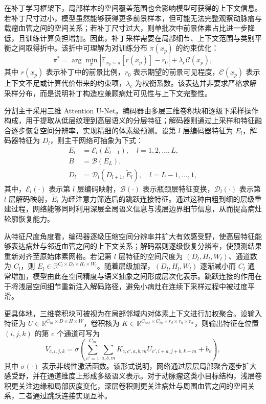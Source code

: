 在补丁学习框架下，局部样本的空间覆盖范围也会影响模型可获得的上下文信息。若补丁尺寸过小，模型虽然能够获得更多前景样本，但可能无法完整观察动脉瘤与载瘤血管之间的空间关系；若补丁尺寸过大，则单批次中前景体素占比进一步降低，且训练计算负担增加。因此，补丁采样需要在局部细节、上下文范围与类别平衡之间取得折中。该折中可理解为对训练分布 $\pi(x_p)$ 的约束优化：
\begin{equation}
\pi^{\ast}=\arg\min_{\pi}\left|\mathbb{E}_{x_p\sim\pi}[r(x_p)]-r_0\right|+\lambda_c\mathcal{C}(x_p),
\end{equation}
其中 $r(x_p)$ 表示补丁中的前景比例，$r_0$ 表示期望的前景可见程度，$\mathcal{C}(x_p)$ 表示上下文不足或计算代价带来的约束项，$\lambda_c$ 为权衡系数。该表达并非要求严格求解采样分布，而是说明补丁构造应兼顾病灶可见性与上下文完整性。

分割主干采用三维 Attention U-Net。编码器由多层三维卷积块和逐级下采样操作构成，用于提取从低层纹理到高层语义的分层特征；解码器则通过上采样和特征融合逐步恢复空间分辨率，实现精细的体素级预测。设第 $l$ 层编码器特征为 $E_l$，解码器特征为 $D_l$，则主干网络可抽象为下式：
\begin{align}
E_l &= \mathcal{E}_l(E_{l-1}), \quad l=1,2,\ldots,L,\\
B &= \mathcal{B}(E_L),\\
D_l &= \mathcal{D}_l(D_{l+1},\widetilde{E}_l), \quad l=L-1,\ldots,1,
\end{align}
其中，$\mathcal{E}_l(\cdot)$ 表示第 $l$ 层编码映射，$\mathcal{B}(\cdot)$ 表示瓶颈层特征变换，$\mathcal{D}_l(\cdot)$ 表示第 $l$ 层解码映射，$\widetilde{E}_l$ 为经注意力筛选后的跳跃连接特征。通过这种由粗到细的层级重建过程，网络能够同时利用深层全局语义信息与浅层边界细节信息，从而提高病灶轮廓恢复能力。

从特征尺度角度看，编码器逐级压缩空间分辨率并扩大有效感受野，使高层特征能够表达病灶与邻近血管之间的上下文关系；解码器则逐级恢复分辨率，使预测结果重新对齐至原始体素网格。若记第 $l$ 层特征的空间尺度为 $(D_l,H_l,W_l)$、通道数为 $C_l$，则 $E_l\in\mathbb{R}^{C_l\times D_l\times H_l\times W_l}$。随着层级加深，$(D_l,H_l,W_l)$ 逐渐减小而 $C_l$ 通常增加，模型由此在空间精度与语义抽象之间形成层次化表示。跳跃连接的作用在于将浅层空间细节重新注入解码路径，避免小病灶在连续下采样过程中被过度平滑。

更具体地，三维卷积块可被视为在局部邻域内对体素上下文进行加权聚合。设输入特征为 $U\in\mathbb{R}^{C_{in}\times D\times H\times W}$，卷积核为 $K\in\mathbb{R}^{C_{out}\times C_{in}\times r_d\times r_h\times r_w}$，则输出特征在位置 $(i,j,k)$ 的第 $c$ 个通道可写为
\begin{equation}
V_{c,i,j,k}=\sigma\left(\sum_{c'=1}^{C_{in}}\sum_{a,b,m}K_{c,c',a,b,m}U_{c',i+a,j+b,k+m}+b_c\right),
\end{equation}
其中 $\sigma(\cdot)$ 表示非线性激活函数。该形式说明，网络通过层层局部聚合逐步扩大感受野，并在通道维度上形成多级语义表示。对于动脉瘤这类小目标结构，浅层卷积更关注边缘和局部灰度变化，深层卷积则更关注病灶与周围血管之间的空间关系，二者通过跳跃连接实现互补。

